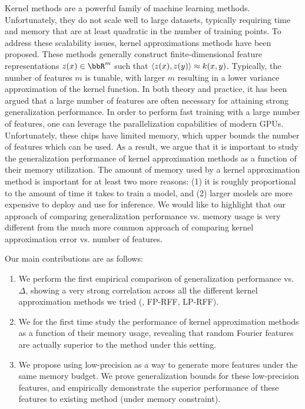Kernel methods are a powerful family of machine learning methods.  Unfortunately, they do not scale well to large datasets, typically requiring time and memory that are at least quadratic in the number of training points. To address these scalability issues, kernel approximations methods have been proposed. These methods generally construct finite-dimensional feature representations $z(x) \in \RR^m$ such that $\langle z(x),z(y) \rangle \approx k(x,y)$.  Typically, the number of features $m$ is tunable, with larger $m$ resulting in a lower variance approximation of the kernel function.  In both theory and practice, it has been argued that a large number of features are often necessary for attaining strong generalization performance.  In order to perform fast training with a large number of features, one can leverage the parallelization capabilities of modern GPUs.  Unfortunately, these chips have limited memory, which upper bounds the number of features which can be used.  As a result, we argue that it is important to study the generalization performance of kernel approximation methods as a function of their memory utilization. The amount of memory used by a kernel approximation method is important for at least two more reasons: (1) it is roughly proportional to the amount of time it takes to train a model, and (2) larger models are more expensive to deploy and use for inference.  We would like to highlight that our approach of comparing generalization performance vs. memory usage is very different from the much more common approach of comparing kernel approximation error vs. number of features.

Our main contributions are as follows:
\begin{enumerate}
	\item We perform the first empirical comparison of generalization performance vs. $\Delta$, showing a very strong correlation across all the different kernel approximation methods we tried (\Nystrom, FP-RFF, LP-RFF).
	\item We for the first time study the performance of kernel approximation methods as a function of their memory usage, revealing that random Fourier features are actually superior to the \Nystrom method under this setting.
	\item We propose using low-precision as a way to generate more features under the same memory budget.  We prove generalization bounds for these low-precision features, and empirically demonstrate the superior performance of these features to existing method (under memory constraint).
\end{enumerate}
	